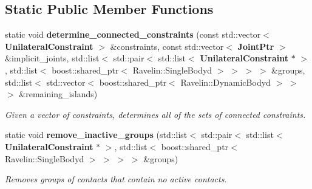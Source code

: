 \subsection*{Static Public Member Functions}
\begin{DoxyCompactItemize}
\item 
static void {\bf determine\-\_\-connected\-\_\-constraints} (const std\-::vector$<$ {\bf Unilateral\-Constraint} $>$ \&constraints, const std\-::vector$<$ {\bf Joint\-Ptr} $>$ \&implicit\-\_\-joints, std\-::list$<$ std\-::pair$<$ std\-::list$<$ {\bf Unilateral\-Constraint} $\ast$ $>$, std\-::list$<$ boost\-::shared\-\_\-ptr$<$ Ravelin\-::\-Single\-Bodyd $>$ $>$ $>$ $>$ \&groups, std\-::list$<$ std\-::vector$<$ boost\-::shared\-\_\-ptr$<$ Ravelin\-::\-Dynamic\-Bodyd $>$ $>$ $>$ \&remaining\-\_\-islands)
\begin{DoxyCompactList}\small\item\em Given a vector of constraints, determines all of the sets of connected constraints. \end{DoxyCompactList}\item 
static void {\bf remove\-\_\-inactive\-\_\-groups} (std\-::list$<$ std\-::pair$<$ std\-::list$<$ {\bf Unilateral\-Constraint} $\ast$ $>$, std\-::list$<$ boost\-::shared\-\_\-ptr$<$ Ravelin\-::\-Single\-Bodyd $>$ $>$ $>$ $>$ \&groups)\label{classMoby_1_1UnilateralConstraint_ac942e3b1f755df42b721730757eeb942}

\begin{DoxyCompactList}\small\item\em Removes groups of contacts that contain no active contacts. \end{DoxyCompactList}\end{DoxyCompactItemize}
